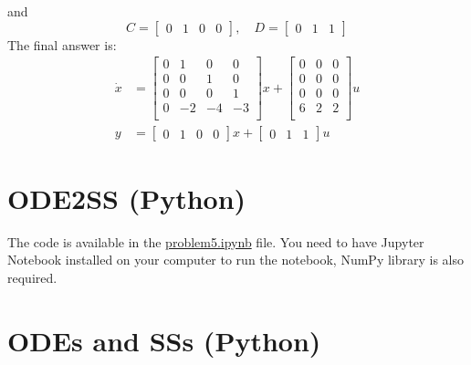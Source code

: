 \documentclass{article}
\begin{document}
    and 
    \begin{equation}
        C = 
        \begin{bmatrix}
            0 & 1 & 0 & 0
        \end{bmatrix}, \quad
        D = 
        \begin{bmatrix}
            0 & 1 & 1
        \end{bmatrix}
    \end{equation}
    The final answer is:
    \begin{align}
        \dot{x} &=
        \begin{bmatrix}
            0 & 1 & 0 & 0\\
            0 & 0 & 1 & 0\\
            0 & 0 & 0 & 1\\
            0 & -2 & -4 & -3\\
        \end{bmatrix}
        x + 
        \begin{bmatrix}
            0 & 0 & 0\\
            0 & 0 & 0\\
            0 & 0 & 0\\
            6 & 2 & 2\\
        \end{bmatrix}
        u\\
        y &= 
        \begin{bmatrix}
            0 & 1 & 0 & 0
        \end{bmatrix}
        x + 
        \begin{bmatrix}
            0 & 1 & 1
        \end{bmatrix}
        u
    \end{align}
    
\section{ODE2SS (Python)}
    The code is available in the \href{run:problem5.ipynb}{problem5.ipynb} file.
    You need to have Jupyter Notebook installed on your computer to run the notebook, NumPy library is also required.
\section{ODEs and SSs (Python)}
    
\end{document}
